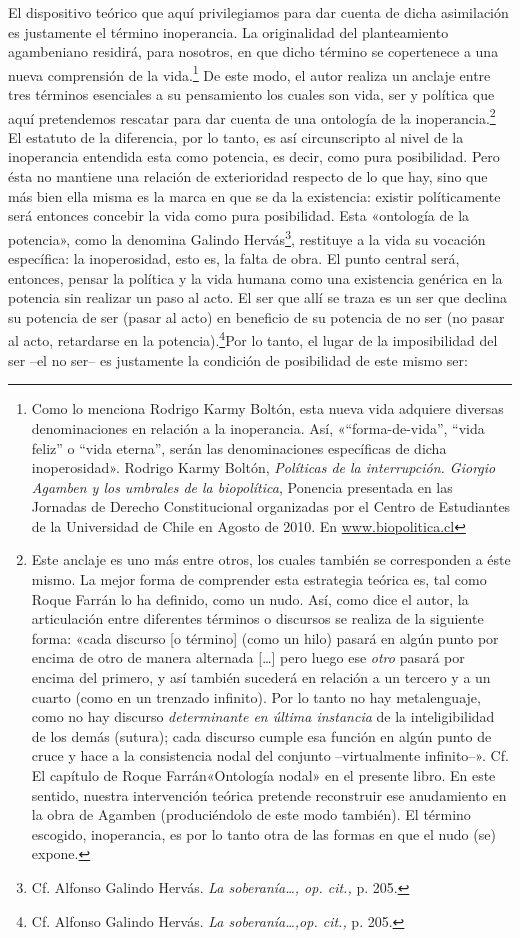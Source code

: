 El dispositivo teórico que aquí privilegiamos para dar cuenta de dicha asimilación es justamente el término inoperancia. La originalidad del planteamiento agambeniano residirá, para nosotros, en que dicho término se copertenece a una nueva comprensión de la vida.\footnote{Como lo menciona Rodrigo Karmy Boltón, esta nueva vida adquiere diversas denominaciones en relación a la inoperancia. Así, «``forma-de-vida'', ``vida feliz'' o ``vida eterna'', serán las denominaciones específicas de dicha inoperosidad». Rodrigo Karmy Boltón, \emph{Políticas de la interrupción. Giorgio Agamben y los umbrales de la biopolítica}, Ponencia presentada en las Jornadas de Derecho Constitucional organizadas por el Centro de Estudiantes de la Universidad de Chile en Agosto de 2010. En \href{http://www.biopolitica.cl/}{www.biopolitica.cl}} De este modo, el autor realiza un anclaje entre tres términos esenciales a su pensamiento los cuales son vida, ser y política que aquí pretendemos rescatar para dar cuenta de una ontología de la inoperancia.\footnote{Este anclaje es uno más entre otros, los cuales también se corresponden a éste mismo. La mejor forma de comprender esta estrategia teórica es, tal como Roque Farrán lo ha definido, como un nudo. Así, como dice el autor, la articulación entre diferentes términos o discursos se realiza de la siguiente forma: «cada discurso {[}o término{]} (como un hilo) pasará en algún punto por encima de otro de manera alternada {[}\ldots{]} pero luego ese \emph{otro} pasará por encima del primero, y así también sucederá en relación a un tercero y a un cuarto (como en un trenzado infinito). Por lo tanto no hay metalenguaje, como no hay discurso \emph{determinante en última instancia} de la inteligibilidad de los demás (sutura); cada discurso cumple esa función en algún punto de cruce y hace a la consistencia nodal del conjunto --virtualmente infinito--». Cf. El capítulo de Roque Farrán«Ontología nodal» en el presente libro. En este sentido, nuestra intervención teórica pretende reconstruir ese anudamiento en la obra de Agamben (produciéndolo de este modo también). El término escogido, inoperancia, es por lo tanto otra de las formas en que el nudo (se) expone.} El estatuto de la diferencia, por lo tanto, es así circunscripto al nivel de la inoperancia entendida esta como potencia, es decir, como pura posibilidad. Pero ésta no mantiene una relación de exterioridad respecto de lo que hay, sino que más bien ella misma es la marca en que se da la existencia: existir políticamente será entonces concebir la vida como pura posibilidad. Esta «ontología de la potencia», como la denomina Galindo Hervás\footnote{Cf. Alfonso Galindo Hervás. \emph{La soberanía\ldots, op. cit.,} p. 205.}, restituye a la vida su vocación específica: la inoperosidad, esto es, la falta de obra. El punto central será, entonces, pensar la política y la vida humana como una existencia genérica en la potencia sin realizar un paso al acto. El ser que allí se traza es un ser que declina su potencia de ser (pasar al acto) en beneficio de su potencia de no ser (no pasar al acto, retardarse en la potencia).\footnote{Cf. Alfonso Galindo Hervás. \emph{La soberanía\ldots,op. cit.,} p. 205.}Por lo tanto, el lugar de la imposibilidad del ser --el no ser-- es justamente la condición de posibilidad de este mismo ser: 